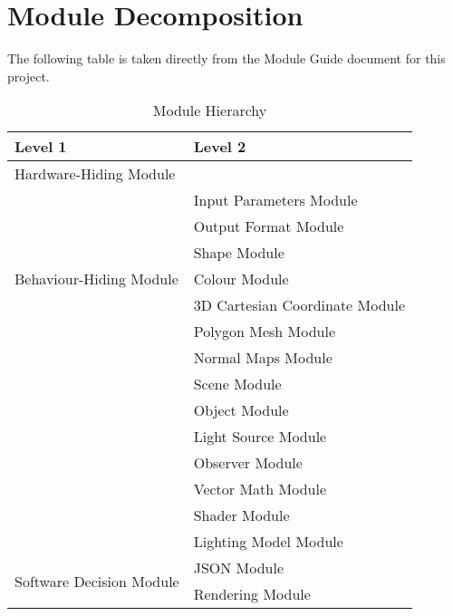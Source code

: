 \documentclass[12pt, titlepage]{article}
\begin{document}
\section{Module Decomposition}

The following table is taken directly from the Module Guide document for this project.

\begin{table}[h!]
	\centering
	\begin{tabular}{p{} p{}}
		\toprule
		\textbf{Level 1} & \textbf{Level 2}\\
		\midrule
		
		{Hardware-Hiding Module} & ~ \\
		\midrule
		
		\multirow{7}{0.3\textwidth}{Behaviour-Hiding Module} & Input Parameters 
		Module\\
		& Output Format Module \\
		& Shape Module\\
		& Colour Module\\
		& 3D Cartesian Coordinate Module\\ %
		& Polygon Mesh Module\\ %
		& Normal Maps Module\\ %
		& Scene Module\\
		& Object Module\\
		& Light Source Module\\
		& Observer Module \\
		& Vector Math Module\\ %
		& Shader Module\\
		& Lighting Model Module\\
		\midrule
		\multirow{2}{0.3\textwidth}{Software Decision Module} 
		& JSON Module\\ %
		& Rendering Module\\ %
		\bottomrule
		
	\end{tabular}
	\caption{Module Hierarchy}
	\label{TblMH}
\end{table}
\end{document}
